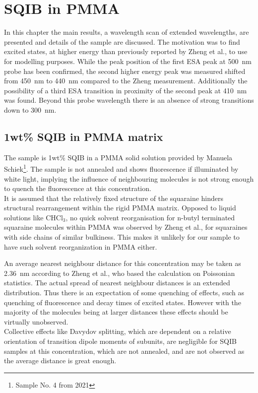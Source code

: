 \documentclass[twoside,openright,listof=numbered]{scrreprt}
\begin{document}
\chapter{SQIB in PMMA}\label{chpt:results}
In this chapter the main results, a wavelength scan of extended wavelengths, are presented and details of the sample are discussed. The motivation was to find excited states, at higher energy than previously reported by Zheng et al.\cite{Zheng2020}, to use for modelling purposes. While the peak position of the first ESA peak at \qty{500}{\nano\meter} probe has been confirmed, the second higher energy peak was measured shifted from \qty{450}{\nano\meter} to \qty{440}{\nano\meter} compared to the Zheng measurement. Additionally the possibility of a third ESA transition in proximity of the second peak at \qty{410}{\nano\meter} was found. Beyond this probe wavelength there is an absence of strong transitions down to \qty{300}{\nano\meter}.

\section{1wt\% SQIB in PMMA matrix}
The sample is 1wt\% SQIB in a PMMA solid solution provided by Manuela Schiek\footnote{Sample No. 4 from 2021}. The sample is not annealed and shows fluorescence if illuminated by white light, implying the influence of neighbouring molecules is not strong enough to quench the fluorescence at this concentration. \\

It is assumed that the relatively fixed structure of the squaraine hinders structural rearrangement within the rigid PMMA matrix.
Opposed to liquid solutions like $\mathrm{CHCl_3}$, no quick solvent reorganisation for n-butyl terminated squaraine molecules within PMMA was observed by Zheng et al.\cite{Zheng2020}, for squaraines with side chains of similar bulkiness. This makes it unlikely for our sample to have such solvent reorganization in PMMA either.

An average nearest neighbour distance for this concentration may be taken as \SI{2.36}{\nano\meter} according to Zheng et al.\cite{Zheng2020}, who based the calculation on Poissonian statistics\cite{Krider2003}. The actual spread of nearest neighbour distances is an extended distribution. Thus there is an expectation of some quenching of effects, such as quenching of fluorescence and decay times of excited states. However with the majority of the molecules being at larger distances these effects should be virtually unobserved.\cite{Zheng2020} \\
Collective effects like Davydov splitting, which are dependent on a relative orientation of transition dipole moments of subunits, are negligible for SQIB samples at this concentration, which are not annealed, and are not observed as the average distance is great enough.\\
\end{document}
